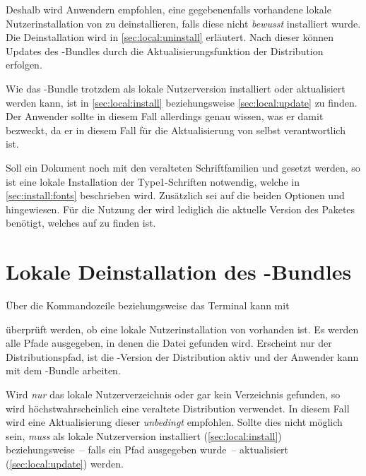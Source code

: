 Deshalb wird Anwendern empfohlen, eine gegebenenfalls vorhandene lokale 
Nutzerinstallation von \TUDScript zu deinstallieren, falls diese nicht 
\emph{bewusst} installiert wurde. Die Deinstallation wird in 
\autoref{sec:local:uninstall} erläutert. Nach dieser können Updates des 
\TUDScript-Bundles durch die Aktualisierungsfunktion der Distribution erfolgen. 

Wie das \TUDScript-Bundle trotzdem als lokale Nutzerversion installiert oder 
aktualisiert werden kann, ist in \autoref{sec:local:install} beziehungsweise 
\autoref{sec:local:update} zu finden. Der Anwender sollte in diesem Fall 
allerdings genau wissen, was er damit bezweckt, da er in diesem Fall für die 
Aktualisierung von \TUDScript selbst verantwortlich ist.

%
%
Soll ein Dokument noch mit den veralteten Schriftfamilien \Univers und \DIN 
gesetzt werden, so ist eine lokale Installation der Type1-Schriften notwendig, 
welche in \autoref{sec:install:fonts} beschrieben wird. Zusätzlich sei auf die 
beiden Optionen  und  hingewiesen. 
Für die Nutzung der \OpenSans wird lediglich die aktuelle Version des Paketes 
 benötigt, welches auf  zu finden ist.



\section{Lokale Deinstallation des \TUDScript-Bundles}
%
%
%
Über die Kommandozeile beziehungsweise das Terminal kann mit
%
\begin{quoting}
\end{quoting}
%
überprüft werden, ob eine lokale Nutzerinstallation von \TUDScript vorhanden 
ist. Es werden alle Pfade ausgegeben, in denen die Datei  
gefunden wird. Erscheint nur der Distributionspfad, ist die \TUDScript-Version 
der Distribution aktiv und der Anwender kann mit dem \TUDScript-Bundle arbeiten.

Wird \emph{nur} das lokale Nutzerverzeichnis oder gar kein Verzeichnis 
gefunden, so wird höchstwahrscheinlich eine veraltete Distribution 
verwendet. In diesem Fall wird eine Aktualisierung dieser \emph{unbedingt} 
empfohlen. Sollte dies nicht möglich sein, \emph{muss} \TUDScript als lokale 
Nutzerversion installiert (\autoref{sec:local:install}) beziehungsweise~-- 
falls ein Pfad ausgegeben wurde~-- aktualisiert (\autoref{sec:local:update}) 
werden.

